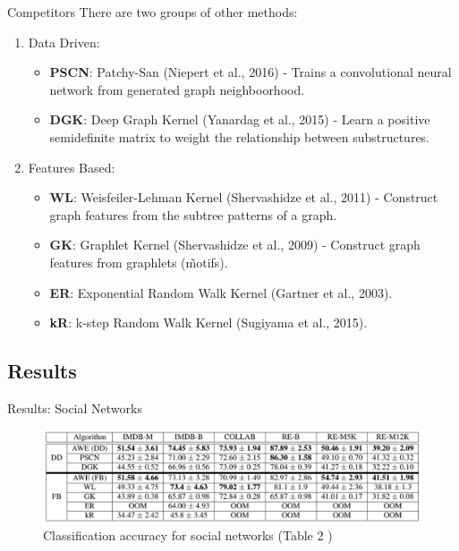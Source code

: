 \documentclass{beamer}
\begin{document}
    \begin{frame}{Competitors}
        There are two groups of other methods:
        \pause
        \begin{enumerate}
            \item Data Driven:
            \begin{itemize}
                \pause
                \item \textbf{PSCN}: Patchy-San (Niepert et al., 2016) - 
                Trains a convolutional neural network from generated graph
                neighboorhood.
                \pause
                \item \textbf{DGK}: Deep Graph Kernel (Yanardag et al., 2015) - 
                Learn a positive semidefinite matrix to weight the relationship
                between substructures.
            \end{itemize}
            \pause
            \item Features Based:
            \begin{itemize}
                \pause
                \item \textbf{WL}: Weisfeiler-Lehman Kernel (Shervashidze
                et al., 2011) - Construct graph features from the subtree 
                patterns of a graph.
                \pause
                \item \textbf{GK}: Graphlet Kernel (Shervashidze et al., 2009)
                - Construct graph features from graphlets (\~motifs).
                \pause
                \item \textbf{ER}: Exponential Random Walk Kernel 
                (Gartner et al., 2003).
                \item \textbf{kR}: k-step Random Walk Kernel 
                (Sugiyama et al., 2015).
            \end{itemize}
        \end{enumerate}
    \end{frame}

    \subsection{Results}

    \begin{frame}{Results: Social Networks}
        \begin{figure}
            \centering
            \includegraphics[width=\textwidth]{imgs/result_social.png}
            \caption{Classification accuracy for social networks
            (Table 2 \cite{pmlr-v80-ivanov18a})}
            \label{fig:socialresults}
        \end{figure}
    \end{frame}
\end{document}
